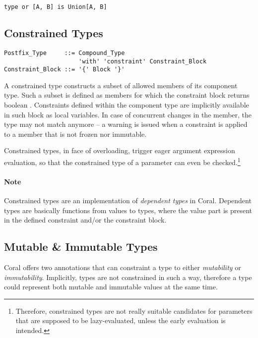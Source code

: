 \begin{lstlisting}
type or [A, B] is Union[A, B]
\end{lstlisting}





\subsection{Constrained Types}
\label{sec:constrained-types}

\syntax\begin{lstlisting}
Postfix_Type     ::= Compound_Type 
                     'with' 'constraint' Constraint_Block
Constraint_Block ::= '{' Block '}'
\end{lstlisting}

A constrained type constructs a subset of allowed members of its component type. Such a subset is defined as members for which the constraint block returns boolean . Constraints defined within the component type are implicitly available in such block as local variables. In case of concurrent changes in the member, the type may not match anymore -- a warning is issued when a constraint is applied to a member that is not frozen nor immutable. 

Constrained types, in face of overloading, trigger eager argument expression evaluation, so that the constrained type of a parameter can even be checked.\footnote{Therefore, constrained types are not really suitable candidates for parameters that are supposed to be lazy-evaluated, unless the early evaluation is intended.}

\paragraph{Note}
Constrained types are an implementation of {\em dependent types} in Coral. Dependent types are basically functions from values to types, where the value part is present in the defined constraint and/or the constraint block. 





\subsection{Mutable \& Immutable Types}
\label{sec:mutable-immutable-types}

Coral offers two annotations that can constraint a type to either {\em mutability} or {\em immutability}. Implicitly, types are not constrained in such a way, therefore a type could represent both mutable and immutable values at the same time. 

